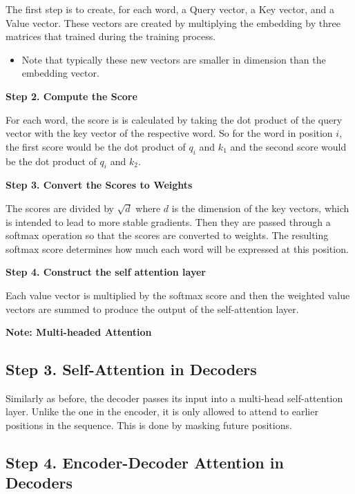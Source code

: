 \documentclass[
]{book}
\providecommand{\tightlist}{%
  \setlength{\itemsep}{0pt}\setlength{\parskip}{0pt}}
\begin{document}
The first step is to create, for each word, a Query vector, a Key vector, and a Value vector. These vectors are created by multiplying the embedding by three matrices that trained during the training process.

\begin{itemize}
\tightlist
\item
  Note that typically these new vectors are smaller in dimension than the embedding vector.
\end{itemize}

\textbf{Step 2. Compute the Score}

For each word, the score is is calculated by taking the dot product of the query vector with the key vector of the respective word. So for the word in position \(i\), the first score would be the dot product of \(q_i\) and \(k_1\) and the second score would be the dot product of \(q_i\) and \(k_2\).

\textbf{Step 3. Convert the Scores to Weights}

The scores are divided by \(\sqrt{d}\) where \(d\) is the dimension of the key vectors, which is intended to lead to more stable gradients. Then they are passed through a softmax operation so that the scores are converted to weights. The resulting softmax score determines how much each word will be expressed at this position.

\textbf{Step 4. Construct the self attention layer}

Each value vector is multiplied by the softmax score and then the weighted value vectors are summed to produce the output of the self-attention layer.

\textbf{Note: Multi-headed Attention}

\hypertarget{step-3.-self-attention-in-decoders}{%
\subsection{Step 3. Self-Attention in Decoders}\label{step-3.-self-attention-in-decoders}}

Similarly as before, the decoder passes its input into a multi-head self-attention layer. Unlike the one in the encoder, it is only allowed to attend to earlier positions in the sequence. This is done by masking future positions.

\hypertarget{step-4.-encoder-decoder-attention-in-decoders}{%
\subsection{Step 4. Encoder-Decoder Attention in Decoders}\label{step-4.-encoder-decoder-attention-in-decoders}}
\end{document}
